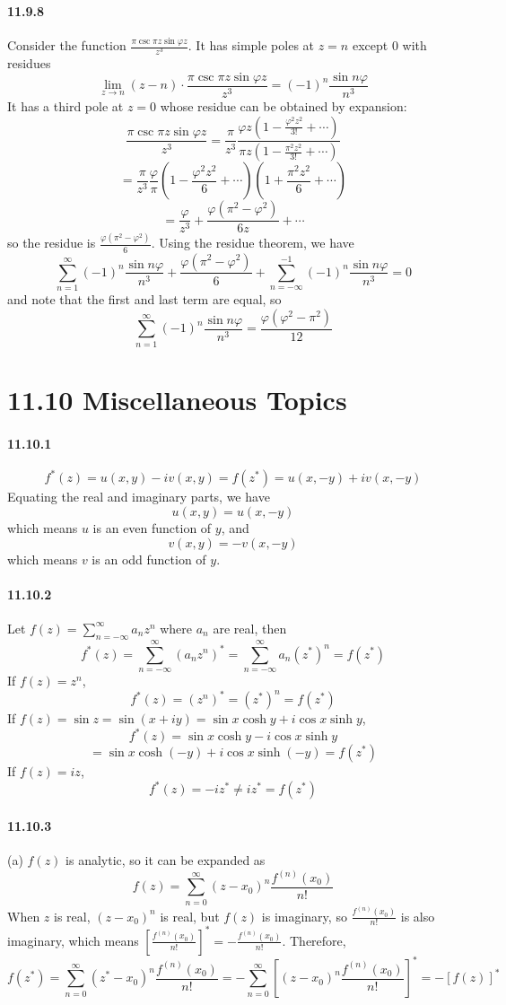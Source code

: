 \documentclass[a4paper]{article}
\begin{document}
\paragraph{11.9.8}
Consider the function $\frac{\pi\csc\pi z\sin\varphi z}{z^3}$. It has simple poles at $z=n$ except $0$ with residues
\[
\lim_{z\to n}(z-n)\cdot\frac{\pi\csc\pi z\sin\varphi z}{z^3}=(-1)^n\frac{\sin n\varphi}{n^3}
\]
It has a third pole at $z=0$ whose residue can be obtained by expansion:
\[
\frac{\pi\csc\pi z\sin\varphi z}{z^3}=\frac{\pi}{z^3}\frac{\varphi z(1-\frac{\varphi^2z^2}{3!}+\cdots)}{\pi z(1-\frac{\pi^2z^2}{3!}+\cdots)}
\]
\[
=\frac{\pi}{z^3}\frac{\varphi}{\pi}(1-\frac{\varphi^2z^2}{6}+\cdots)(1+\frac{\pi^2z^2}{6}+\cdots)
\]
\[
=\frac{\varphi}{z^3}+\frac{\varphi(\pi^2-\varphi^2)}{6z}+\cdots
\]
so the residue is $\frac{\varphi(\pi^2-\varphi^2)}{6}$. Using the residue theorem, we have
\[
\sum_{n=1}^\infty(-1)^n\frac{\sin n\varphi}{n^3}+\frac{\varphi(\pi^2-\varphi^2)}{6}+\sum_{n=-\infty}^{-1}(-1)^n\frac{\sin n\varphi}{n^3}=0
\]
and note that the first and last term are equal, so
\[
\sum_{n=1}^\infty(-1)^n\frac{\sin n\varphi}{n^3}=\frac{\varphi(\varphi^2-\pi^2)}{12}
\]

\section*{11.10 Miscellaneous Topics}
\paragraph{11.10.1}
\[
f^*(z)=u(x,y)-iv(x,y)=f(z^*)=u(x,-y)+iv(x,-y)
\]
Equating the real and imaginary parts, we have
\[
u(x,y)=u(x,-y)
\]
which means $u$ is an even function of $y$, and
\[
v(x,y)=-v(x,-y)
\]
which means $v$ is an odd function of $y$.

\paragraph{11.10.2}
Let $f(z)=\sum_{n=-\infty}^\infty a_nz^n$ where $a_n$ are real, then
\[
f^*(z)=\sum_{n=-\infty}^\infty(a_nz^n)^*=\sum_{n=-\infty}^\infty a_n(z^*)^n=f(z^*)
\]
If $f(z)=z^n$,
\[
f^*(z)=(z^n)^*=(z^*)^n=f(z^*)
\]
If $f(z)=\sin z=\sin(x+iy)=\sin x\cosh y+i\cos x\sinh y$,
\[
f^*(z)=\sin x\cosh y-i\cos x\sinh y\]
\[=\sin x\cosh(-y)+i\cos x\sinh(-y)=f(z^*)
\]
If $f(z)=iz$,
\[
f^*(z)=-iz^*\neq iz^*=f(z^*)
\]

\paragraph{11.10.3}
(a) $f(z)$ is analytic, so it can be expanded as
\[
f(z)=\sum_{n=0}^\infty(z-x_0)^n\frac{f^{(n)}(x_0)}{n!}
\]
When $z$ is real, $(z-x_0)^n$ is real, but $f(z)$ is imaginary, so $\frac{f^{(n)}(x_0)}{n!}$ is also imaginary, which means $\left[\frac{f^{(n)}(x_0)}{n!}\right]^*=-\frac{f^{(n)}(x_0)}{n!}$. Therefore,
\[
f(z^*)=\sum_{n=0}^\infty(z^*-x_0)^n\frac{f^{(n)}(x_0)}{n!}=-\sum_{n=0}^\infty\left[(z-x_0)^n\frac{f^{(n)}(x_0)}{n!} \right]^*=-\left[f(z)\right]^*
\]
\end{document}
